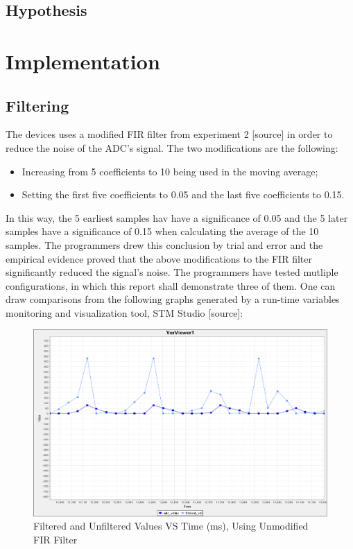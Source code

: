 \documentclass[12pt]{report}
\begin{document}
\subsection{Hypothesis}
\section{Implementation}
\subsection{Filtering}
The devices uses a modified FIR filter from experiment 2 [source] in order to reduce the noise of the ADC's signal. The two modifications are the following: 
\begin{itemize}
	\item Increasing from 5 coefficients to 10 being used in the moving average;
	\item Setting the first five coefficients to 0.05 and the last five coefficients to 0.15.
\end{itemize}
In this way, the 5 earliest samples hav have a significance of 0.05 and the 5 later samples have a significance of 0.15 when calculating the average of the 10 samples. The programmers drew this conclusion by trial and error and the empirical evidence proved that the above modifications to the FIR filter significantly reduced the signal's noise. The programmers have tested mutliple configurations, in which this report shall demonstrate three of them. One can draw comparisons from the following graphs generated by a run-time variables monitoring and visualization tool, STM Studio [source]:\\
\begin{figure}[h]
	\label{Linear Graph of the Filtered and Unfiltered Values Plotted Against Time}
	\begin{center}
		\includegraphics[scale=0.5]{./figures/adc_5coeffs.PNG}
		\caption{Filtered and Unfiltered Values VS Time (ms), Using Unmodified FIR Filter}
	\end{center}
\end{figure}
\end{document}
